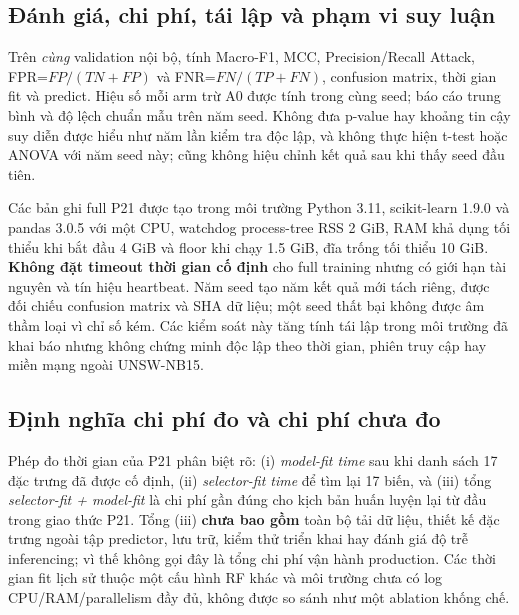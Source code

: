 \subsection{Đánh giá, chi phí, tái lập và phạm vi suy luận}
Trên \emph{cùng} validation nội bộ, tính Macro-F1, MCC, Precision/Recall Attack, FPR=$FP/(TN+FP)$ và FNR=$FN/(TP+FN)$, confusion matrix, thời gian fit và predict. Hiệu số mỗi arm trừ A0 được tính trong cùng seed; báo cáo trung bình và độ lệch chuẩn mẫu trên năm seed. Không đưa p-value hay khoảng tin cậy suy diễn được hiểu như năm lần kiểm tra độc lập, và không thực hiện t-test hoặc ANOVA với năm seed này; cũng không hiệu chỉnh kết quả sau khi thấy seed đầu tiên.

Các bản ghi full P21 được tạo trong môi trường Python 3.11, scikit-learn 1.9.0 và pandas 3.0.5 với một CPU, watchdog process-tree RSS 2 GiB, RAM khả dụng tối thiểu khi bắt đầu 4 GiB và floor khi chạy 1.5 GiB, đĩa trống tối thiểu 10 GiB. \textbf{Không đặt timeout thời gian cố định} cho full training nhưng có giới hạn tài nguyên và tín hiệu heartbeat. Năm seed tạo năm kết quả mới tách riêng, được đối chiếu confusion matrix và SHA dữ liệu; một seed thất bại không được âm thầm loại vì chỉ số kém. Các kiểm soát này tăng tính tái lập trong môi trường đã khai báo nhưng không chứng minh độc lập theo thời gian, phiên truy cập hay miền mạng ngoài UNSW-NB15.


\subsection{Định nghĩa chi phí đo và chi phí chưa đo}
Phép đo thời gian của P21 phân biệt rõ: (i) \emph{model-fit time} sau khi danh sách 17 đặc trưng đã được cố định, (ii) \emph{selector-fit time} để tìm lại 17 biến, và (iii) tổng \emph{selector-fit + model-fit} là chi phí gần đúng cho kịch bản huấn luyện lại từ đầu trong giao thức P21. Tổng (iii) \textbf{chưa bao gồm} toàn bộ tải dữ liệu, thiết kế đặc trưng ngoài tập predictor, lưu trữ, kiểm thử triển khai hay đánh giá độ trễ inferencing; vì thế không gọi đây là tổng chi phí vận hành production. Các thời gian fit lịch sử thuộc một cấu hình RF khác và môi trường chưa có log CPU/RAM/parallelism đầy đủ, không được so sánh như một ablation khống chế.
